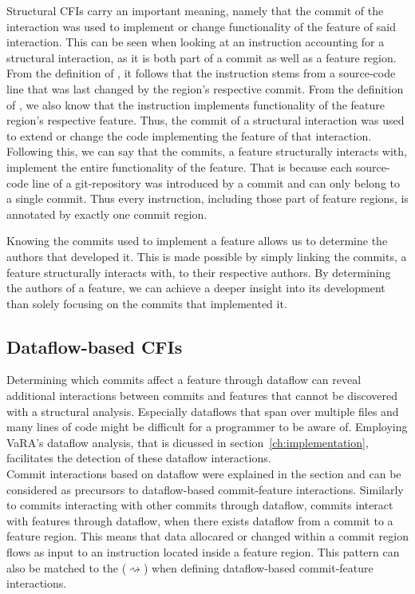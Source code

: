 Structural CFIs carry an important meaning, namely that the commit of the interaction was used to implement or change functionality of the feature of said interaction.
This can be seen when looking at an instruction accounting for a structural interaction, as it is both part of a commit as well as a feature region.
From the definition of , it follows that the instruction stems from a source-code line that was last changed by the region's respective commit. 
From the definition of , we also know that the instruction implements functionality of the feature region's respective feature. 
Thus, the commit of a structural interaction was used to extend or change the code implementing the feature of that interaction.
Following this, we can say that the commits, a feature structurally interacts with, implement the entire functionality of the feature.
That is because each source-code line of a git-repository was introduced by a commit and can only belong to a single commit.
Thus every instruction, including those part of feature regions, is annotated by exactly one commit region. 

Knowing the commits used to implement a feature allows us to determine the authors that developed it.
This is made possible by simply linking the commits, a feature structurally interacts with, to their respective authors.
By determining the authors of a feature, we can achieve a deeper insight into its development than solely focusing on the commits that implemented it. 

\subsection{Dataflow-based CFIs}\label{sec:dataflow_cfis}

Determining which commits affect a feature through dataflow can reveal additional interactions between commits and features that cannot be discovered with a structural analysis.
Especially dataflows that span over multiple files and many lines of code might be difficult for a programmer to be aware of.
Employing VaRA's dataflow analysis, that is dicussed in section~\ref{ch:implementation}, facilitates the detection of these dataflow interactions. \\
Commit interactions based on dataflow were explained in the  section and can be considered as precursors to dataflow-based commit-feature interactions.
Similarly to commits interacting with other commits through dataflow, commits interact with features through dataflow, when there exists dataflow from a commit to a feature region.
This means that data allocared or changed within a commit region flows as input to an instruction located inside a feature region.
This pattern can also be matched to the  ($\rightsquigarrow$) when defining dataflow-based commit-feature interactions.

